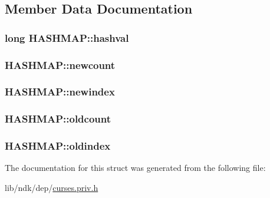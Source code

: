 \subsection{Member Data Documentation}
\hypertarget{struct_h_a_s_h_m_a_p_ab9ee7e28b92cd2bf5f168e32cb3eebc9}{
\subsubsection[{hashval}]{ long H\-A\-S\-H\-M\-A\-P\-::hashval}}\label{struct_h_a_s_h_m_a_p_ab9ee7e28b92cd2bf5f168e32cb3eebc9}
\hypertarget{struct_h_a_s_h_m_a_p_a64f6ed4c0247f0ef1fde834067e5ef9b}{
\subsubsection[{newcount}]{ H\-A\-S\-H\-M\-A\-P\-::newcount}}\label{struct_h_a_s_h_m_a_p_a64f6ed4c0247f0ef1fde834067e5ef9b}
\hypertarget{struct_h_a_s_h_m_a_p_ad659cf55495a6eae254925d04604c4f2}{
\subsubsection[{newindex}]{ H\-A\-S\-H\-M\-A\-P\-::newindex}}\label{struct_h_a_s_h_m_a_p_ad659cf55495a6eae254925d04604c4f2}
\hypertarget{struct_h_a_s_h_m_a_p_aa0e9e33b062ab8695d16d149a35ea34b}{
\subsubsection[{oldcount}]{ H\-A\-S\-H\-M\-A\-P\-::oldcount}}\label{struct_h_a_s_h_m_a_p_aa0e9e33b062ab8695d16d149a35ea34b}
\hypertarget{struct_h_a_s_h_m_a_p_ac469027596988cc84fd824707a28daf3}{
\subsubsection[{oldindex}]{ H\-A\-S\-H\-M\-A\-P\-::oldindex}}\label{struct_h_a_s_h_m_a_p_ac469027596988cc84fd824707a28daf3}


The documentation for this struct was generated from the following file\-:\begin{DoxyCompactItemize}
\item 
lib/ndk/dep/\hyperlink{curses_8priv_8h}{curses.\-priv.\-h}\end{DoxyCompactItemize}
